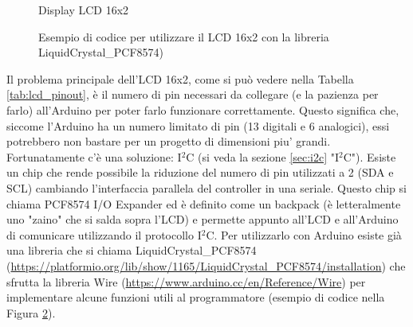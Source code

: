 \documentclass[12pt]{report}
\begin{document}
\begin{figure}
	\caption{Display LCD 16x2}
	\label{fig:16x2}
\end{figure}

\begin{figure}
	\caption{Esempio di codice per utilizzare il LCD 16x2 con la libreria LiquidCrystal\_PCF8574)}
	\label{fig:lcd_code}
\end{figure}

Il problema principale dell'LCD 16x2, come si può vedere nella Tabella \ref{tab:lcd_pinout}, è il numero di pin necessari da collegare (e la pazienza per farlo) all'Arduino per poter farlo funzionare correttamente. Questo significa che, siccome l'Arduino ha un numero limitato di pin (13 digitali e 6 analogici), essi potrebbero non bastare per un progetto di dimensioni piu' grandi. Fortunatamente c'è una soluzione: I$^2$C (si veda la sezione \ref{sec:i2c} "I$^2$C"). Esiste un chip che rende possibile la riduzione del numero di pin utilizzati a 2 (SDA e SCL) cambiando l'interfaccia parallela del controller in una seriale. Questo chip si chiama PCF8574 I/O Expander ed è definito come un backpack (è letteralmente uno "zaino" che si salda sopra l'LCD) e permette appunto all'LCD e all'Arduino di comunicare utilizzando il protocollo I$^2$C. Per utilizzarlo con Arduino esiste già una libreria che si chiama LiquidCrystal\_PCF8574 (\url{https://platformio.org/lib/show/1165/LiquidCrystal_PCF8574/installation}) che sfrutta la libreria Wire (\url{https://www.arduino.cc/en/Reference/Wire}) per implementare alcune funzioni utili al programmatore (esempio di codice nella Figura \ref{fig:lcd_code}).
\end{document}
